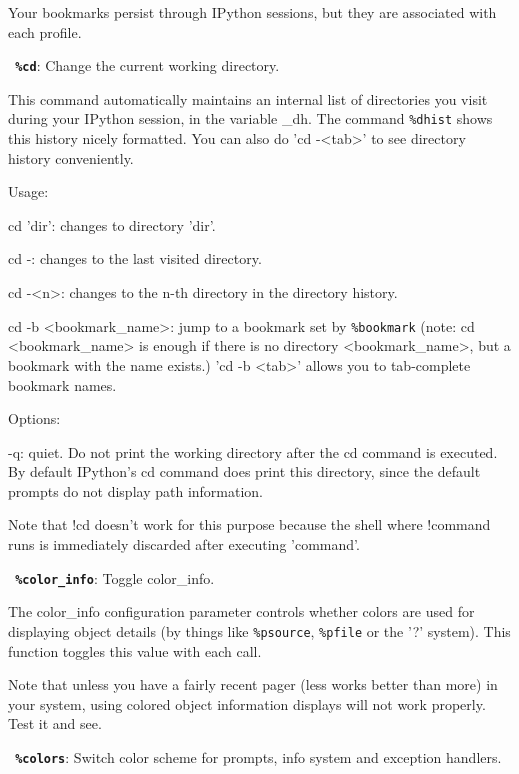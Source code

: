         Your bookmarks persist through IPython sessions, but they are
        associated with each profile.

\bigskip
\texttt{\textbf{ \%cd}}:
	Change the current working directory.

        This command automatically maintains an internal list of directories
        you visit during your IPython session, in the variable \_dh. The
        command \texttt{\%dhist} shows this history nicely formatted. You can also
        do 'cd -<tab>' to see directory history conveniently.

        Usage:

          cd 'dir': changes to directory 'dir'.

          cd -: changes to the last visited directory.

          cd -<n>: changes to the n-th directory in the directory history.

          cd -b <bookmark\_name>: jump to a bookmark set by \texttt{\%bookmark}
             (note: cd <bookmark\_name> is enough if there is no
              directory <bookmark\_name>, but a bookmark with the name exists.)
              'cd -b <tab>' allows you to tab-complete bookmark names. 

        Options:

        -q: quiet.  Do not print the working directory after the cd command is
        executed.  By default IPython's cd command does print this directory,
        since the default prompts do not display path information.
        
        Note that !cd doesn't work for this purpose because the shell where
        !command runs is immediately discarded after executing 'command'.

\bigskip
\texttt{\textbf{ \%color\_info}}:
	Toggle color\_info.

        The color\_info configuration parameter controls whether colors are
        used for displaying object details (by things like \texttt{\%psource}, \texttt{\%pfile} or
        the '?' system). This function toggles this value with each call.

        Note that unless you have a fairly recent pager (less works better
        than more) in your system, using colored object information displays
        will not work properly. Test it and see.

\bigskip
\texttt{\textbf{ \%colors}}:
	Switch color scheme for prompts, info system and exception handlers.

